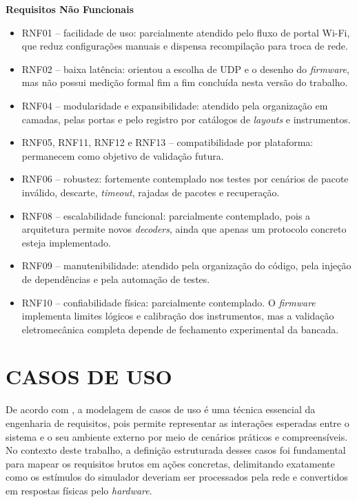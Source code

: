 \documentclass[
  12pt,
  oneside,
  a4paper,
  chapter=TITLE,
  section=TITLE,
  subsection=TITLE,
  brazil
]{abntex2}
\newcommand{\estrangeirismo}[1]{\textit{#1}}
\begin{document}
\textbf{Requisitos Não Funcionais}
\begin{itemize}
  \item RNF01 -- facilidade de uso: parcialmente atendido pelo fluxo de portal Wi-Fi, que reduz configurações manuais e dispensa recompilação para troca de rede.
  \item RNF02 -- baixa latência: orientou a escolha de UDP e o desenho do \estrangeirismo{firmware}, mas não possui medição formal fim a fim concluída nesta versão do trabalho.
  \item RNF04 -- modularidade e expansibilidade: atendido pela organização em camadas, pelas portas e pelo registro por catálogos de \estrangeirismo{layouts} e instrumentos.
  \item RNF05, RNF11, RNF12 e RNF13 -- compatibilidade por plataforma: permanecem como objetivo de validação futura.
  \item RNF06 -- robustez: fortemente contemplado nos testes por cenários de pacote inválido, descarte, \estrangeirismo{timeout}, rajadas de pacotes e recuperação.
  \item RNF08 -- escalabilidade funcional: parcialmente contemplado, pois a arquitetura permite novos \estrangeirismo{decoders}, ainda que apenas um protocolo concreto esteja implementado.
  \item RNF09 -- manutenibilidade: atendido pela organização do código, pela injeção de dependências e pela automação de testes.
  \item RNF10 -- confiabilidade física: parcialmente contemplado. O \estrangeirismo{firmware} implementa limites lógicos e calibração dos instrumentos, mas a validação eletromecânica completa depende de fechamento experimental da bancada.
\end{itemize}

\section{CASOS DE USO}

De acordo com , a modelagem de casos de uso é uma técnica essencial da engenharia de requisitos, pois permite representar as interações esperadas entre o sistema e o seu ambiente externo por meio de cenários práticos e compreensíveis. No contexto deste trabalho, a definição estruturada desses casos foi fundamental para mapear os requisitos brutos em ações concretas, delimitando exatamente como os estímulos do simulador deveriam ser processados pela rede e convertidos em respostas físicas pelo \estrangeirismo{hardware}.
\end{document}
